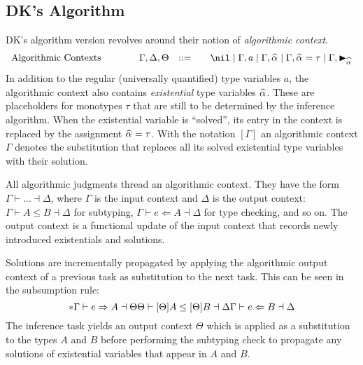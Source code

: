\subsection{DK's Algorithm}\label{ssec:DK_Algorithm}

DK's algorithm version revolves around their notion of \emph{algorithmic context}.
\[
\begin{array}{l@{\qquad}lcl}
\text{Algorithmic Contexts}\qquad&\Gamma,\Delta,\Theta &::=&\quad \nil \mid
\Gamma, a \mid \Gamma, \al \mid \Gamma, \al = \tau \mid
\Gamma, \blacktriangleright_{\al}
\end{array}
\]
In addition to the regular (universally quantified) type variables $a$, the
algorithmic context also contains \emph{existential} type variables
$\al$. These are placeholders for monotypes $\tau$ that are still to
be determined by the inference algorithm. When the existential variable is
``solved'', its entry in the context is replaced by the assignment
$\al = \tau$. With the notation $[\Gamma]$ an algorithmic context
$\Gamma$ denotes the substitution that replaces all its solved existential type
variables with their solution.

All algorithmic judgments thread an algorithmic context. They have the form
$\Gamma \vdash \ldots \dashv \Delta$, where $\Gamma$ is the input context and
$\Delta$ is the output context:
$\Gamma \vdash A \le B \dashv \Delta$  for subtyping, 
$\Gamma \vdash e \Leftarrow A \dashv \Delta$  for type checking, and so on. 
The output context is a functional update of the input context that records newly
introduced existentials and solutions.

Solutions are incrementally propagated by applying the algorithmic output
context of a previous task as substitution to the next task. This can be seen
in the subsumption rule:
\[
*
  {\Gamma \vdash e \Rightarrow A \dashv \Theta \\ 
   \Theta \vdash [\Theta]A \le [\Theta]B \dashv \Delta
  }
  { \Gamma \vdash e \Leftarrow B \dashv \Delta}
\]
The inference task yields an output context $\Theta$ which is applied as a substitution
to the types $A$ and $B$ before performing the subtyping check to propagate any solutions
of existential variables that appear in $A$ and $B$.

